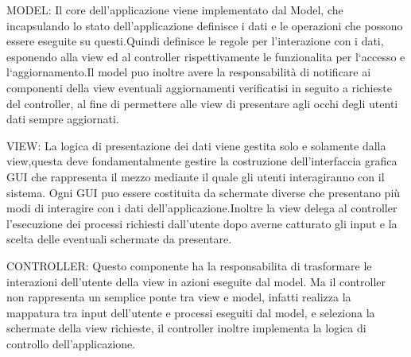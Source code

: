 \documentclass[12pt, a4paper, oneside]{book}
\begin{document}
MODEL: Il core dell’applicazione viene implementato dal Model, che incapsulando lo stato dell’applicazione definisce i dati e le operazioni che possono essere eseguite su questi.Quindi definisce le regole per l’interazione con i dati, esponendo alla view ed al controller rispettivamente le funzionalita per l‘accesso e l‘aggiornamento.Il model puo inoltre avere la responsabilità di notificare ai componenti della view eventuali aggiornamenti verificatisi in seguito a richieste del
controller, al fine di permettere alle view di presentare agli occhi degli utenti dati sempre aggiornati.

VIEW: La logica di presentazione dei dati viene gestita solo e solamente dalla view,questa deve fondamentalmente gestire la costruzione dell’interfaccia grafica GUI che rappresenta il mezzo mediante il quale gli utenti interagiranno con il sistema. Ogni GUI puo essere costituita da schermate diverse che presentano più modi di interagire con i dati dell’applicazione.Inoltre la view delega al controller
l’esecuzione dei processi richiesti dall’utente dopo averne catturato gli input e la scelta delle eventuali schermate da presentare. 

CONTROLLER: Questo componente ha la responsabilita di trasformare le interazioni dell’utente della view in azioni eseguite dal model. Ma il controller non rappresenta un semplice ponte tra view e model, infatti realizza la mappatura tra input dell’utente e processi eseguiti dal model, e seleziona la schermate della view richieste, il controller inoltre implementa la logica di controllo dell’applicazione.
\end{document}
